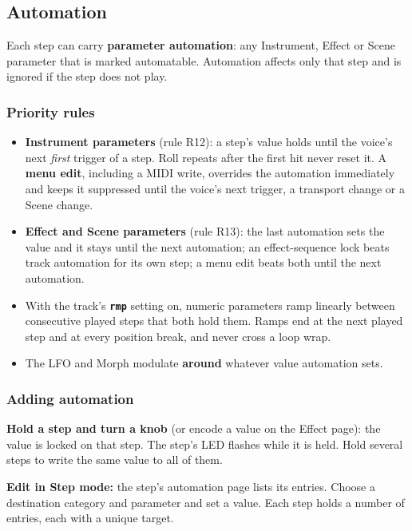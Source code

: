\subsection{Automation}\label{automation}

Each step can carry \textbf{parameter automation}: any Instrument,
Effect or Scene parameter that is marked automatable. Automation affects
only that step and is ignored if the step does not play.

\subsubsection{Priority rules}\label{priority-rules}

\begin{itemize}
\tightlist
\item
  \textbf{Instrument parameters} (rule R12): a step's value holds until
  the voice's next \emph{first} trigger of a step. Roll repeats after
  the first hit never reset it. A \textbf{menu edit}, including a MIDI
  write, overrides the automation immediately and keeps it suppressed
  until the voice's next trigger, a transport change or a Scene change.
\item
  \textbf{Effect and Scene parameters} (rule R13): the last automation
  sets the value and it stays until the next automation; an
  effect-sequence lock beats track automation for its own step; a menu
  edit beats both until the next automation.
\item
  With the track's \textbf{\texttt{rmp}} setting on, numeric parameters
  ramp linearly between consecutive played steps that both hold them.
  Ramps end at the next played step and at every position break, and
  never cross a loop wrap.
\item
  The LFO and Morph modulate \textbf{around} whatever value automation
  sets.
\end{itemize}

\subsubsection{Adding automation}\label{adding-automation}

\textbf{Hold a step and turn a knob} (or encode a value on the Effect
page): the value is locked on that step. The step's LED flashes while it
is held. Hold several steps to write the same value to all of them.

\textbf{Edit in Step mode:} the step's automation page lists its
entries. Choose a destination category and parameter and set a value.
Each step holds a number of entries, each with a unique target.

